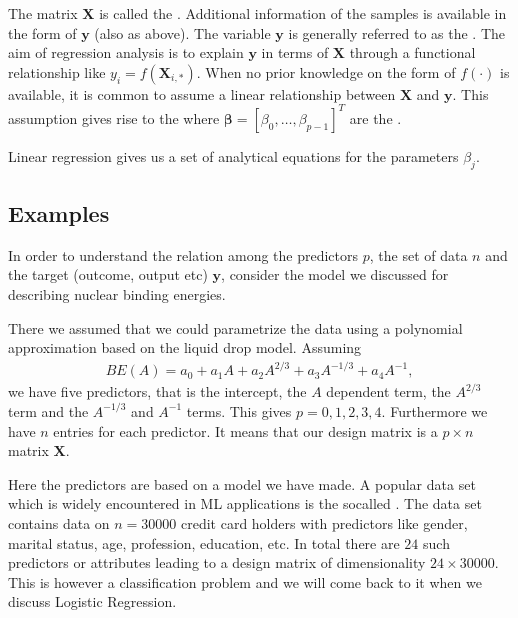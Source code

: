 \documentclass[letterpaper,10pt,english]{sphinxmanual}
\begin{document}
The matrix \(\mathbf{X}\) is called the . Additional information of the samples is available in the
form of \(\boldsymbol{y}\) (also as above). The variable \(\boldsymbol{y}\) is
generally referred to as the . The aim of
regression analysis is to explain \(\boldsymbol{y}\) in terms of
\(\boldsymbol{X}\) through a functional relationship like \(y_i =
f(\mathbf{X}_{i,\ast})\). When no prior knowledge on the form of
\(f(\cdot)\) is available, it is common to assume a linear relationship
between \(\boldsymbol{X}\) and \(\boldsymbol{y}\). This assumption gives rise to
the  where \(\boldsymbol{\beta} = [\beta_0, \ldots,
\beta_{p-1}]^{T}\) are the .

Linear regression gives us a set of analytical equations for the parameters \(\beta_j\).


\subsection{Examples}
\label{\detokenize{chapter4:examples}}
In order to understand the relation among the predictors \(p\), the set of data \(n\) and the target (outcome, output etc) \(\boldsymbol{y}\),
consider the model we discussed for describing nuclear binding energies.

There we assumed that we could parametrize the data using a polynomial approximation based on the liquid drop model.
Assuming
\begin{equation*}
\begin{split}
BE(A) = a_0+a_1A+a_2A^{2/3}+a_3A^{-1/3}+a_4A^{-1},
\end{split}
\end{equation*}
we have five predictors, that is the intercept, the \(A\) dependent term, the \(A^{2/3}\) term and the \(A^{-1/3}\) and \(A^{-1}\) terms.
This gives \(p=0,1,2,3,4\). Furthermore we have \(n\) entries for each predictor. It means that our design matrix is a
\(p\times n\) matrix \(\boldsymbol{X}\).

Here the predictors are based on a model we have made. A popular data set which is widely encountered in ML applications is the
so\sphinxhyphen{}called . The data set contains data on \(n=30000\) credit card holders with predictors like gender, marital status, age, profession, education, etc. In total there are \(24\) such predictors or attributes leading to a design matrix of dimensionality \(24 \times 30000\). This is however a classification problem and we will come back to it when we discuss Logistic Regression.
\end{document}
